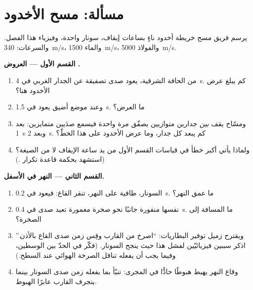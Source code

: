 \section{مسألة: مسح الأخدود}

\begin{problem}\label{pb:g7:sound-production:1}
يرسم فريق مسح خريطة أخدود ناءٍ بساعات إيقاف،  سونار
واحدة، وفيزياء هذا الفصل. والسرعات:  \qty{340}{m/s}،
والماء \qty{1500}{m/s}، والفولاذ \qty{5000}{m/s}.

\medskip\noindent\textbf{القسم الأول --- العروض .}
\begin{enumerate}
  \item من الحافة الشرقية، يعود صدى تصفيقة عن الجدار الغربي في
        \qty{4}{s}. كم يبلغ عرض الأخدود هنا؟
  \item وعند موضع أضيق يعود  في \qty{1.5}{s}. ما العرض؟
  \item ومسّاح يقف \emph{بين} جدارين متوازيين يصفّق مرة واحدة
        فيسمع صدَيين متمايزين: بعد \qty{1}{s} وبعد \qty{2}{s}.
        كم يبعد كل جدار، وما عرض الأخدود على هذا الخطّ؟
  \item ولماذا يأتي أكبر خطأ في قياسات القسم الأول من يد ساعة
        الإيقاف لا من الصيغة؟ (استشهد بحكمة قاعدة تكرار
        .)
\end{enumerate}

\medskip\noindent\textbf{القسم الثاني --- النهر في الأسفل.}
\begin{enumerate}[resume]
  \item {} السونار، طافية على النهر، تنقر القاع: فيعود 
        في \qty{0.2}{s}. ما عمق النهر؟
  \item {} نفسها منقورة جانبًا نحو صخرة مغمورة تعيد صدى
        في \qty{0.4}{s}. ما المسافة إلى الصخرة؟
  \item ويقترح زميل توفير البطاريات: ``اصرخ من القارب وقِس زمن
        صدى القاع بالأذن.'' اذكر سببين فيزيائيّين لفشل هذا حيث
        ينجح السونار. (فكّر في الحدّ بين الوسطين، وفيما يجب أن
        يفعله تناقل الصرخة الهوائي عند السطح.)
  \item وقاع النهر يهبط هبوطًا حادًّا في  المجرى: تنبّأ بما
        يفعله زمن صدى السونار بينما ينجرف القارب عابرًا
        الهبوط.
\end{enumerate}


\end{problem}
